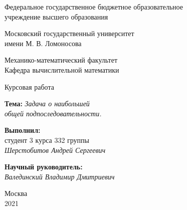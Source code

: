 \documentclass[12pt]{article}
\begin{document}
\begin{titlepage}

    \begin{center}
    \large{Федеральное государственное бюджетное образовательное\\
    учреждение высшего образования\\}

    Московский государственный университет\\
    имени М. В. Ломоносова\\

    \vspace{0.25 cm}

    \normalsize{Механико-математический факультет\\}
    \vspace{0.5 cm}
    Кафедра вычислительной математики\\
    \end{center}

    \vspace{3cm}

    \begin{center}
    \LARGE{Курсовая работа}\\

    \vspace{0.5 cm}

    \normalsize{}
    \textbf{Тема:} \textit{Задача о наибольшей\\общей подпоследовательности.}
    \end{center}

    \vspace{3 cm}

    \begin{flushright}
    \textbf{Выполнил:}\\
    студент 3 курса
    332 группы\\

    \textit{Шерстобитов Андрей Сергеевич}\\

    \vspace{1 cm}

    \textbf{Научный руководитель:}\\

    \textit{Валединский Владимир Дмитриевич}
    \end{flushright}

    \vspace{\fill}
    \normalsize{}
    \begin{center}
    Москва\\2021
    \end{center}

    \thispagestyle{empty}
    \end{titlepage}
    \newpage
\tableofcontents
    \newpage
\end{document}
